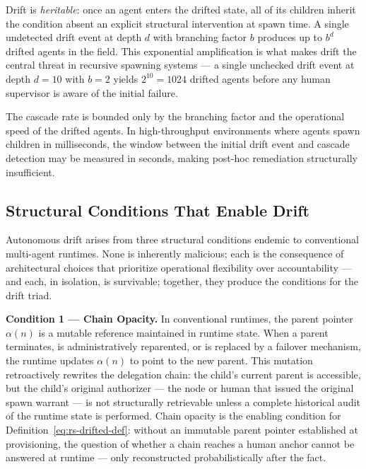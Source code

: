 Drift is \emph{heritable}: once an agent enters the drifted state, all of its children inherit the condition absent an explicit structural intervention at spawn time. A single undetected drift event at depth $d$ with branching factor $b$ produces up to $b^{d}$ drifted agents in the field. This exponential amplification is what makes drift the central threat in recursive spawning systems — a single unchecked drift event at depth $d=10$ with $b=2$ yields $2^{10}=1024$ drifted agents before any human supervisor is aware of the initial failure.

The cascade rate is bounded only by the branching factor and the operational speed of the drifted agents. In high-throughput environments where agents spawn children in milliseconds, the window between the initial drift event and cascade detection may be measured in seconds, making post-hoc remediation structurally insufficient.

\subsection{Structural Conditions That Enable Drift}
\label{sec:rs-drift-conditions}

Autonomous drift arises from three structural conditions endemic to conventional multi-agent runtimes. None is inherently malicious; each is the consequence of architectural choices that prioritize operational flexibility over accountability — and each, in isolation, is survivable; together, they produce the conditions for the drift triad.

\medskip
\noindent\textbf{Condition 1 — Chain Opacity.}
In conventional runtimes, the parent pointer $\alpha(n)$ is a mutable reference maintained in runtime state. When a parent terminates, is administratively reparented, or is replaced by a failover mechanism, the runtime updates $\alpha(n)$ to point to the new parent. This mutation retroactively rewrites the delegation chain: the child's current parent is accessible, but the child's original authorizer — the node or human that issued the original spawn warrant — is not structurally retrievable unless a complete historical audit of the runtime state is performed. Chain opacity is the enabling condition for Definition~\ref{eq:rs-drifted-def}: without an immutable parent pointer established at provisioning, the question of whether a chain reaches a human anchor cannot be answered at runtime — only reconstructed probabilistically after the fact.

